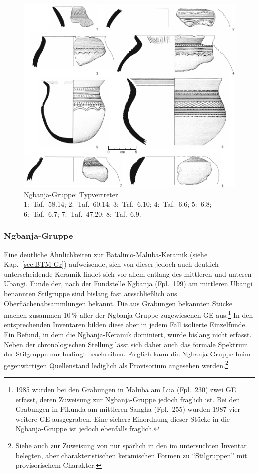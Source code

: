 \begin{figure}[tb]
	\centering
	\includegraphics[width=.925\textwidth]{fig/NGB-Typen.pdf}
	\caption{\mbox{Ngbanja}-Gruppe: Typvertreter.\\1:~Taf.~58.14; 2:~Taf.~60.14; 3:~Taf.~6.10; 4:~Taf.~6.6; 5:~6.8; 6:~Taf.~6.7; 7:~Taf.~47.20; 8:~Taf.~6.9.}
	\label{fig:NGB_Typverteter}
\end{figure}

\subsubsection{\mbox{Ngbanja}-Gruppe}\label{sec:NGB-Gr}

Eine deutliche Ähnlichkeiten zur Batalimo-Maluba-Keramik (siehe Kap.~\ref{sec:BTM-Gr}) aufweisende, sich von dieser jedoch auch deutlich unterscheidende Keramik findet sich vor allem entlang des mittleren und unteren \mbox{Ubangi}. Funde der, nach der Fundstelle \mbox{Ngbanja} (Fpl.~199) am mittleren \mbox{Ubangi} benannten Stilgruppe sind bislang fast ausschließlich aus Oberflächenabsammlungen bekannt. Die aus Grabungen bekannten Stücke machen zusammen 10\,\% aller der \mbox{Ngbanja}-Gruppe zugewiesenen GE aus.\footnote{1985 wurden bei den Grabungen in Maluba am Lua (Fpl.~230) zwei GE erfasst, deren Zuweisung zur \mbox{Ngbanja}-Gruppe jedoch fraglich ist. Bei den Grabungen in Pikunda am mittleren \mbox{Sangha} (Fpl.~255) wurden 1987 vier weitere GE ausgegraben. Eine sichere Einordnung dieser Stücke in die \mbox{Ngbanja}-Gruppe ist jedoch ebenfalls fraglich.} In den entsprechenden Inventaren bilden diese aber in jedem Fall isolierte Einzelfunde. Ein Befund, in dem die \mbox{Ngbanja}-Keramik dominiert, wurde bislang nicht erfasst. Neben der chronologischen Stellung lässt sich daher auch das formale Spektrum der Stilgruppe nur bedingt beschreiben. Folglich kann die \mbox{Ngbanja}-Gruppe beim gegenwärtigen Quellenstand lediglich als Provisorium angesehen werden.\footnote{Siehe auch \textcite[185\,f., 202]{Wotzka.1995} zur Zuweisung von nur spärlich in den im untersuchten Inventar belegten, aber charakteristischen keramischen Formen zu \enquote{Stilgruppen} mit provisorischem Charakter.\label{ftn:ProvisorischeStilGr}}

